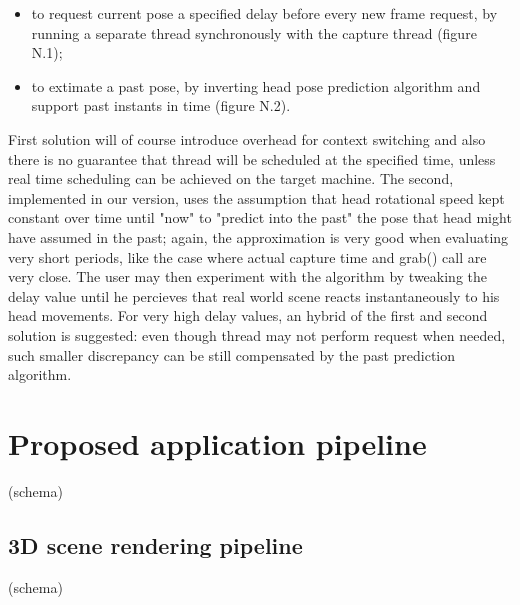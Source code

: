\begin{itemize}
\item to request current pose a specified delay before every new frame request, by running a separate thread synchronously with the capture thread (figure N.1);
\item to extimate a past pose, by inverting head pose prediction algorithm and support past instants in time (figure N.2).
\end{itemize}
First solution will of course introduce overhead for context switching and also there is no guarantee that thread will be scheduled at the specified time, unless real time scheduling can be achieved on the target machine. The second, implemented in our version, uses the assumption that head rotational speed kept constant over time until "now" to "predict into the past" the pose that head might have assumed in the past; again, the approximation is very good when evaluating very short periods, like the case where actual capture time and grab() call are very close. The user may then experiment with the algorithm by tweaking the delay value until he percieves that real world scene reacts instantaneously to his head movements. For very high delay values, an hybrid of the first and second solution is suggested: even though thread may not perform request when needed, such smaller discrepancy can be still compensated by the past prediction algorithm.

\section{Proposed application pipeline}

(schema)

\subsection{3D scene rendering pipeline}

(schema)

